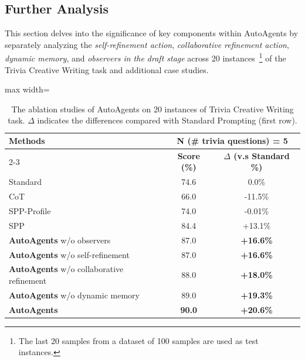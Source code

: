 \subsection{Further Analysis}
\label{sec:further analysis}

This section delves into the significance of key components within AutoAgents by separately analyzing the \textit{self-refinement action}, \textit{collaborative refinement action}, \textit{dynamic memory}, and \textit{observers in the draft stage} across 20 instances~\footnote{The last 20 samples from a dataset of 100 samples are used as test instances.} of the Trivia Creative Writing task and additional case studies.

\begin{table}[!htbp]
\caption{The ablation studies of AutoAgents on 20 instances of Trivia Creative Writing task. $\Delta$ indicates the differences compared with Standard Prompting (first row).}
\label{tab:ablation}
\centering
\begin{adjustbox}{max width=\linewidth}
\begin{tabular}{lcc}
\toprule
\multirow{2}{*}{\textbf{Methods}} &\multicolumn{2}{c}{\textbf{N (\# trivia questions) = 5 }}  \\
\cmidrule{2-3}
& \textbf{Score (\%)} & \textbf{$\Delta$ (v.s Standard \%)} \\
\midrule
Standard & 74.6 & 0.0\%  \\ 
CoT~\cite{yao2023tree} & 66.0 & \textcolor{textred}{-11.5\%} \\
SPP-Profile~\cite{wang2023unleashing} & 74.0 & \textcolor{textred}{-0.01\%}  \\
SPP~\cite{wang2023unleashing} & 84.4 & \textcolor{textgreen}{+13.1\%}  \\
\midrule
\textbf{AutoAgents} w/o observers & 87.0 & \textcolor{textgreen}{\textbf{+16.6\%}} \\
\textbf{AutoAgents} w/o self-refinement & 87.0 & \textcolor{textgreen}{\textbf{+16.6\%}} \\
\textbf{AutoAgents} w/o collaborative refinement & 88.0 & \textcolor{textgreen}{\textbf{+18.0\%}} \\
\textbf{AutoAgents} w/o dynamic memory & 89.0 & \textcolor{textgreen}{\textbf{+19.3\%}} \\
\textbf{AutoAgents} & \textbf{90.0} & \textcolor{textgreen}{\textbf{+20.6\%}} \\
\bottomrule
\end{tabular}
\end{adjustbox}
\end{table}

